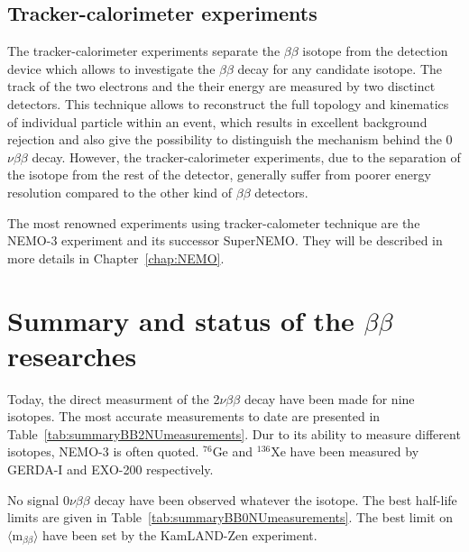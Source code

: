 \documentclass[main.tex]{subfiles}
\begin{document}
\subsection{Tracker-calorimeter experiments}


\NI The tracker-calorimeter experiments separate the $\beta\beta$ isotope from the detection device which allows to investigate the $\beta\beta$ decay for any candidate isotope. The track of the two electrons and the their energy are measured by two disctinct detectors. This technique allows to reconstruct the full topology and kinematics of individual particle within an event, which results in excellent background rejection and also give the possibility to distinguish the mechanism behind the 0$\nu\beta\beta$ decay. However, the tracker-calorimeter experiments, due to the separation of the isotope from the rest of the detector, generally suffer from poorer energy resolution compared to the other kind of $\beta\beta$ detectors. 


\bigskip


\NI The most renowned experiments using tracker-calometer technique are the NEMO-3 experiment and its successor SuperNEMO. They will be described in more details in Chapter~\ref{chap:NEMO}.


\section{Summary and status of the $\beta\beta$ researches}\label{sec:StatusDBD}


\NI Today, the direct measurment of the 2$\nu\beta\beta$ decay have been made for nine isotopes. The most accurate measurements to date are presented in Table~\ref{tab:summaryBB2NUmeasurements}. Dur to its ability to measure different isotopes, NEMO-3 is often quoted. $^{\text{76}}$Ge and $^{\text{136}}$Xe have been measured by GERDA-I and EXO-200 respectively.


\bigskip


\NI No signal 0$\nu\beta\beta$ decay have been observed whatever the isotope. The best half-life limits are given in Table~\ref{tab:summaryBB0NUmeasurements}. The best limit on $\langle \text{m}_{\beta\beta} \rangle$ have been set by the KamLAND-Zen experiment.


\bigskip
\end{document}
